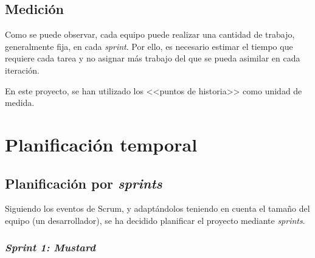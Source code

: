 \subsection{Medición}

Como se puede observar, cada equipo puede realizar una cantidad de trabajo, generalmente fija, en cada \textit{sprint}. Por ello, es necesario estimar el tiempo que requiere cada tarea y no asignar más trabajo del que se pueda asimilar en cada iteración.

En este proyecto, se han utilizado los <<puntos de historia>> como unidad de medida.


\section{Planificación temporal}

\subsection{Planificación por \textit{sprints}}

Siguiendo los eventos de Scrum, y adaptándolos teniendo en cuenta el tamaño del equipo (un desarrollador), se ha decidido planificar el proyecto mediante \textit{sprints}.

\subsubsection{\textit{Sprint 1: Mustard}}

